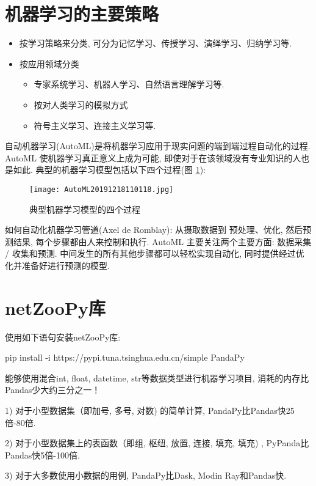 \section{机器学习的主要策略}
\begin{itemize}
\item 按学习策略来分类, 可分为记忆学习、传授学习、演绎学习、归纳学习等.

\item 按应用领域分类
    \begin{itemize}
      \item 专家系统学习、机器人学习、自然语言理解学习等.
      \item 按对人类学习的模拟方式
      \item 符号主义学习、连接主义学习等.
    \end{itemize}
\end{itemize}

自动机器学习(AutoML)是将机器学习应用于现实问题的端到端过程自动化的过程. AutoML 使机器学习真正意义上成为可能, 即使对于在该领域没有专业知识的人也是如此.
典型的机器学习模型包括以下四个过程(图 \ref{AutoML2019fig2702}):
\begin{figure}[H]
    \centering
    \texttt{[image: AutoML20191218110118.jpg]}
    \caption{典型机器学习模型的四个过程}
    \label{AutoML2019fig2702}
\end{figure}
如何自动化机器学习管道(Axel de Romblay):
从摄取数据到 预处理、优化, 然后预测结果, 每个步骤都由人来控制和执行. AutoML 主要关注两个主要方面: 数据采集 / 收集和预测.
中间发生的所有其他步骤都可以轻松实现自动化, 同时提供经过优化并准备好进行预测的模型.
\section{netZooPy库}
使用如下语句安装netZooPy库:

pip install -i https://pypi.tuna.tsinghua.edu.cn/simple PandaPy

能够使用混合int, float, datetime, str等数据类型进行机器学习项目, 消耗的内存比Pandas少大约三分之一！

1) 对于小型数据集（即加号, 多号, 对数) 的简单计算, PandaPy比Pandas快25倍-80倍.

2) 对于小型数据集上的表函数（即组, 枢纽, 放置, 连接, 填充, 填充) , PyPanda比Pandas快5倍-100倍.

3) 对于大多数使用小数据的用例, PandaPy比Dask, Modin Ray和Pandas快.

